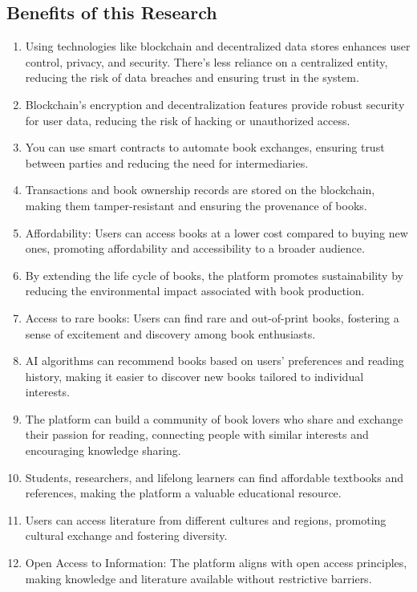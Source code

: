 \documentclass{article}
\begin{document}
\newpage
\subsection{Benefits of this Research}
\begin{enumerate}
    \item Using technologies like blockchain and decentralized data stores enhances user control, privacy, and security. There's less reliance on a centralized entity, reducing the risk of data breaches and ensuring trust in the system.
     \item Blockchain's encryption and decentralization features provide robust security for user data, reducing the risk of hacking or unauthorized access.
     \item You can use smart contracts to automate book exchanges, ensuring trust between parties and reducing the need for intermediaries.
     \item Transactions and book ownership records are stored on the blockchain, making them tamper-resistant and ensuring the provenance of books.
     \item Affordability: Users can access books at a lower cost compared to buying new ones, promoting affordability and accessibility to a broader audience.
     \item By extending the life cycle of books, the platform promotes sustainability by reducing the environmental impact associated with book production.
     \item Access to rare books: Users can find rare and out-of-print books, fostering a sense of excitement and discovery among book enthusiasts.
     \item AI algorithms can recommend books based on users' preferences and reading history, making it easier to discover new books tailored to individual interests.
     \item The platform can build a community of book lovers who share and exchange their passion for reading, connecting people with similar interests and encouraging knowledge sharing.
     \item Students, researchers, and lifelong learners can find affordable textbooks and references, making the platform a valuable educational resource.
     \item Users can access literature from different cultures and regions, promoting cultural exchange and fostering diversity.
     \item Open Access to Information: The platform aligns with open access principles, making knowledge and literature available without restrictive barriers.

\end{enumerate}
\end{document}
